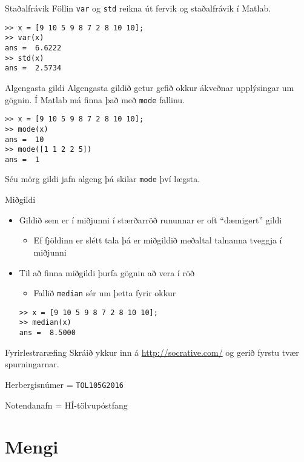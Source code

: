 \documentclass[handout]{beamer}
\begin{document}
\begin{frame}[fragile]{Staðalfrávik}
Föllin \texttt{var} og \texttt{std} reikna út fervik og staðalfrávik í Matlab.
\begin{verbatim}
>> x = [9 10 5 9 8 7 2 8 10 10];
>> var(x)
ans =  6.6222
>> std(x)
ans =  2.5734
\end{verbatim}
\end{frame}

\begin{frame}[fragile]{Algengasta gildi}
Algengasta gildið getur gefið okkur ákveðnar upplýsingar um gögnin. Í Matlab má finna það með \texttt{mode} fallinu.
\begin{verbatim}
>> x = [9 10 5 9 8 7 2 8 10 10];
>> mode(x)
ans =  10
>> mode([1 1 2 2 5])
ans =  1
\end{verbatim}
Séu mörg gildi jafn algeng þá skilar \texttt{mode} því lægsta.
\end{frame}

\begin{frame}[fragile]{Miðgildi}
\begin{itemize}
 \item Gildið sem er í miðjunni í stærðarröð rununnar er oft ``dæmigert'' gildi
 \begin{itemize}
  \item Ef fjöldinn er slétt tala þá er miðgildið meðaltal talnanna tveggja í miðjunni
 \end{itemize}
 \item Til að finna miðgildi þurfa gögnin að vera í röð
 \begin{itemize}
  \item Fallið \texttt{median} sér um þetta fyrir okkur
 \end{itemize}
\begin{verbatim}
>> x = [9 10 5 9 8 7 2 8 10 10];
>> median(x)
ans =  8.5000
\end{verbatim}
\end{itemize}
\end{frame}

\begin{frame}[fragile]{Fyrirlestraræfing}
Skráið ykkur inn á \url{http://socrative.com/} og gerið fyrstu tvær spurningarnar.

Herbergisnúmer = \texttt{TOL105G2016}

Notendanafn = HÍ-tölvupóstfang
\end{frame}

\section{Mengi}
\end{document}
